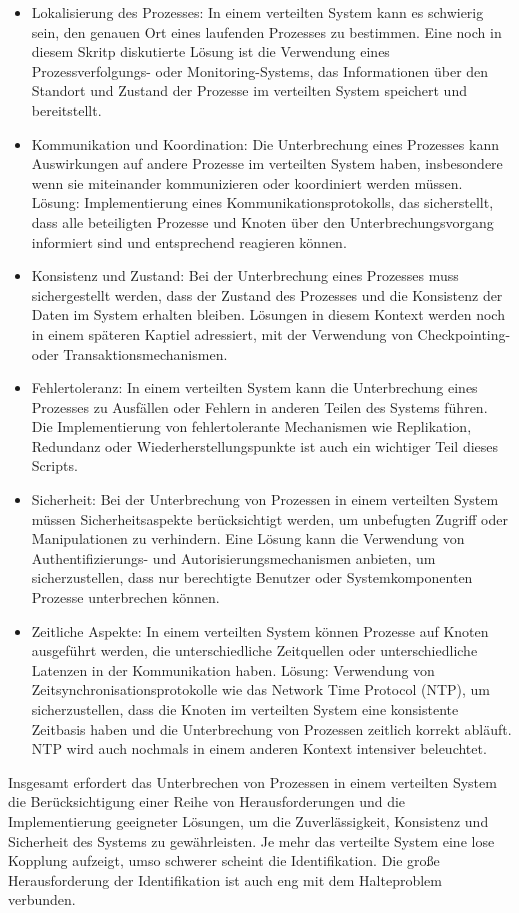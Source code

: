 \begin{itemize}
\item Lokalisierung des Prozesses: In einem verteilten System kann es schwierig sein, den genauen Ort eines laufenden Prozesses zu bestimmen. Eine noch in diesem Skritp diskutierte Lösung ist die Verwendung eines Prozessverfolgungs- oder Monitoring-Systems, das Informationen über den Standort und Zustand der Prozesse im verteilten System speichert und bereitstellt.
\item Kommunikation und Koordination: Die Unterbrechung eines Prozesses kann Auswirkungen auf andere Prozesse im verteilten System haben, insbesondere wenn sie miteinander kommunizieren oder koordiniert werden müssen. Lösung: Implementierung eines Kommunikationsprotokolls, das sicherstellt, dass alle beteiligten Prozesse und Knoten über den Unterbrechungsvorgang informiert sind und entsprechend reagieren können.
\item Konsistenz und Zustand: Bei der Unterbrechung eines Prozesses muss sichergestellt werden, dass der Zustand des Prozesses und die Konsistenz der Daten im System erhalten bleiben. Lösungen in diesem Kontext werden noch in einem späteren Kaptiel adressiert, mit der  Verwendung von Checkpointing- oder Transaktionsmechanismen.
\item Fehlertoleranz: In einem verteilten System kann die Unterbrechung eines Prozesses zu Ausfällen oder Fehlern in anderen Teilen des Systems führen. Die Implementierung von fehlertolerante Mechanismen wie Replikation, Redundanz oder Wiederherstellungspunkte ist auch ein wichtiger Teil dieses Scripts.
\item Sicherheit: Bei der Unterbrechung von Prozessen in einem verteilten System müssen Sicherheitsaspekte berücksichtigt werden, um unbefugten Zugriff oder Manipulationen zu verhindern. Eine Lösung kann die Verwendung von Authentifizierungs- und Autorisierungsmechanismen anbieten, um sicherzustellen, dass nur berechtigte Benutzer oder Systemkomponenten Prozesse unterbrechen können.
\item Zeitliche Aspekte: In einem verteilten System können Prozesse auf Knoten ausgeführt werden, die unterschiedliche Zeitquellen oder unterschiedliche Latenzen in der Kommunikation haben. Lösung: Verwendung von Zeitsynchronisationsprotokolle wie das Network Time Protocol (NTP), um sicherzustellen, dass die Knoten im verteilten System eine konsistente Zeitbasis haben und die Unterbrechung von Prozessen zeitlich korrekt abläuft. NTP wird auch nochmals in einem anderen Kontext intensiver beleuchtet.
\end{itemize}
Insgesamt erfordert das Unterbrechen von Prozessen in einem verteilten System die Berücksichtigung einer Reihe von Herausforderungen und die Implementierung geeigneter Lösungen, um die Zuverlässigkeit, Konsistenz und Sicherheit des Systems zu gewährleisten. Je mehr das verteilte System eine lose Kopplung aufzeigt, umso schwerer scheint die Identifikation. Die große Herausforderung der Identifikation ist auch eng mit dem Halteproblem verbunden.

